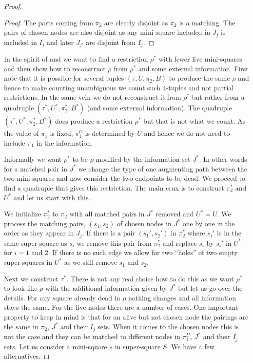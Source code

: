 \documentclass{article}\usepackage[a4paper,margin=20mm]{geometry}
\begin{document}
\begin{proof}
\begin{proof}
The parts coming from $\pi_2$ are clearly disjoint
as $\pi_2$ is a matching.  The pairs of chosen nodes
are also disjoint as any mini-square included in $J_j$
is included in $I_j$ and later $J_{j'}$ are disjoint
from $I_j$.
\end{proof}

In the spirit of \cite{jhtseitin} and \cite{jhkr} we want to find a restriction
$\rho^*$ with fewer live mini-squares and then show how to
reconstruct $\rho$ from $\rho^*$ and some external information.
First note that it is possible for several tuples $(\tau, U, \pi_2, B)$
to produce the same $\rho$ and hence to make counting unambiguous we
count such 4-tuples and not partial restrictions.  In the same vein
we do not reconstruct it from $\rho^*$ but rather from a
quadruple $(\tau^*, U^*, \pi_2^*, B^*)$ (and some external information).
The quadruple 
$(\tau^*, U^*, \pi_2^*, B^*)$ does produce a restriction $\rho^*$ but
that is not what we count.  As the value of $\pi_1$ is fixed,
$\pi_1^U$ is determined by $U$ and hence we do not need to include
$\pi_1$ in the information.

Informally we 
want $\rho^*$ to be $\rho$ modified by the information set $J^*$.
In other words for a matched pair in $J^*$ we change the type of one augmenting
path between the two mini-squares and now consider the two
endpoints to be dead.  We proceed to find a quadruple that
gives this restriction.  The main crux is to construct $\pi_2^*$
and $U^*$ and let us start with this.

We initialize $\pi_2^*$ to  $\pi_2$ with all matched pairs in $J^*$ 
removed and $U^*=U$.  
We process the matching pairs, $(s_1,s_2)$ of chosen nodes
in $J^*$ one by one in the order as they appear in $J_j$.
If there is a pair $(s_1', s_2')$
in $\pi_2^*$ where $s_i'$ is in the same super-square as $s_i$ we remove
this pair from $\pi_2^*$ and replace $s_i$ by $s_i'$ in $U^*$ for $i=1$ and
$2$.  If there is no such edge we allow for two ``holes'' of
two empty super-squares in $U^*$ as we still remove $s_1$ and $s_2$.

Next we construct $\tau^*$.  There is not any real choice
how to do this as we want $\rho^*$ to look like $\rho$ with the
additional information given by $J^*$ but let us go over the 
details.   For any square already dead in $\rho$ nothing changes
and all information stays the same.  For the live nodes
there are a number of cases.  One important property
to keep in mind is that for an alive but not chosen
node the pairings are the same in $\pi_2$, $J^*$ and their
$I_j$ sets. When it comes to the chosen nodes this is not the case
and they can be matched to different nodes in $\pi_1^U$,
$J^*$ and their $I_j$ sets.
Let us consider a mini-square $s$ in super-square $S$.
We have a few alternatives.


\end{proof}
\end{document}
